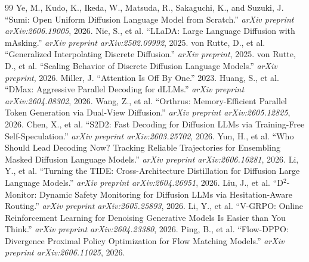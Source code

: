 \documentclass[11pt,a4paper]{article}
\begin{document}
\begin{thebibliography}{99}
 Ye, M., Kudo, K., Ikeda, W., Matsuda, R., Sakaguchi, K., and Suzuki, J. ``Sumi: Open Uniform Diffusion Language Model from Scratch.'' \emph{arXiv preprint arXiv:2606.19005}, 2026.
 Nie, S., et al. ``LLaDA: Large Language Diffusion with mAsking.'' \emph{arXiv preprint arXiv:2502.09992}, 2025.
 von Rutte, D., et al. ``Generalized Interpolating Discrete Diffusion.'' \emph{arXiv preprint}, 2025.
 von Rutte, D., et al. ``Scaling Behavior of Discrete Diffusion Language Models.'' \emph{arXiv preprint}, 2026.
 Miller, J. ``Attention Is Off By One.'' 2023.
 Huang, S., et al. ``DMax: Aggressive Parallel Decoding for dLLMs.'' \emph{arXiv preprint arXiv:2604.08302}, 2026.
 Wang, Z., et al. ``Orthrus: Memory-Efficient Parallel Token Generation via Dual-View Diffusion.'' \emph{arXiv preprint arXiv:2605.12825}, 2026.
 Chen, X., et al. ``S2D2: Fast Decoding for Diffusion LLMs via Training-Free Self-Speculation.'' \emph{arXiv preprint arXiv:2603.25702}, 2026.
 Yun, H., et al. ``Who Should Lead Decoding Now? Tracking Reliable Trajectories for Ensembling Masked Diffusion Language Models.'' \emph{arXiv preprint arXiv:2606.16281}, 2026.
 Li, Y., et al. ``Turning the TIDE: Cross-Architecture Distillation for Diffusion Large Language Models.'' \emph{arXiv preprint arXiv:2604.26951}, 2026.
 Liu, J., et al. ``D$^2$-Monitor: Dynamic Safety Monitoring for Diffusion LLMs via Hesitation-Aware Routing.'' \emph{arXiv preprint arXiv:2605.25893}, 2026.
 Li, Y., et al. ``V-GRPO: Online Reinforcement Learning for Denoising Generative Models Is Easier than You Think.'' \emph{arXiv preprint arXiv:2604.23380}, 2026.
 Ping, B., et al. ``Flow-DPPO: Divergence Proximal Policy Optimization for Flow Matching Models.'' \emph{arXiv preprint arXiv:2606.11025}, 2026.
\end{thebibliography}
\end{document}
